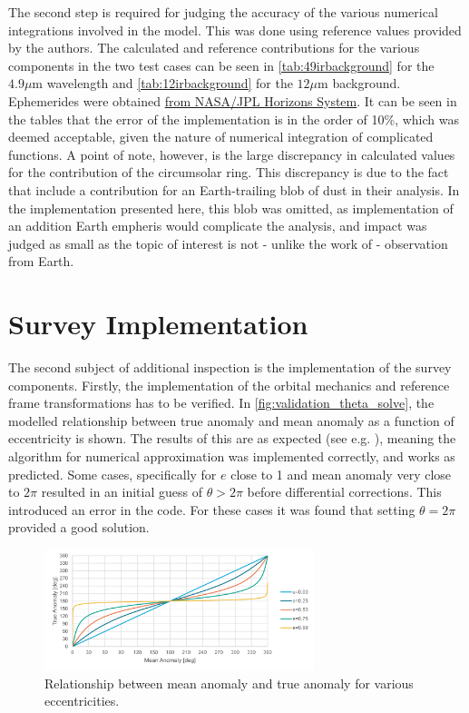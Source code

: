 The second step is required for judging the accuracy of the various numerical integrations involved in the model. This was done using reference values provided by the authors. The calculated and reference contributions for the various components in the two test cases can be seen in \autoref{tab:49irbackground} for the $4.9 \mu\mathrm{m}$ wavelength and \autoref{tab:12irbackground} for the $12 \mu\mathrm{m}$ background. Ephemerides were obtained \href{https://ssd.jpl.nasa.gov/horizons/}{from NASA/JPL Horizons System}. It can be seen in the tables that the error of the implementation is in the order of 10\%, which was deemed acceptable, given the nature of numerical integration of complicated functions. A point of note, however, is the large discrepancy in calculated values for the contribution of the circumsolar ring. This discrepancy is due to the fact that \cite{IRDust} include a contribution for an Earth-trailing blob of dust in their analysis. In the implementation presented here, this blob was omitted, as implementation of an addition Earth empheris would complicate the analysis, and impact was judged as small as the topic of interest is not - unlike the work of \cite{IRDust} - observation from Earth.

\section{Survey Implementation}
\label{sec:vvsurvey}
The second subject of additional inspection is the implementation of the survey components. Firstly, the implementation of the orbital mechanics and reference frame transformations has to be verified. In \autoref{fig:validation_theta_solve}, the modelled relationship between true anomaly and mean anomaly as a function of eccentricity is shown. The results of this are as expected (see e.g. \cite{Curtis}), meaning the algorithm for numerical approximation was implemented correctly, and works as predicted. Some cases, specifically for $e$ close to 1 and mean anomaly very close to $2\pi$ resulted in an initial guess of $\theta > 2\pi$ before differential corrections. This introduced an error in the code. For these cases it was found that setting $\theta = 2\pi$ provided a good solution. \\

\begin{figure}[htbp]
 \centering
 \includegraphics[width=0.7\textwidth]{img/validation_theta_solve.pdf}
 \caption{Relationship between mean anomaly and true anomaly for various eccentricities.}
 \label{fig:validation_theta_solve}
\end{figure}

